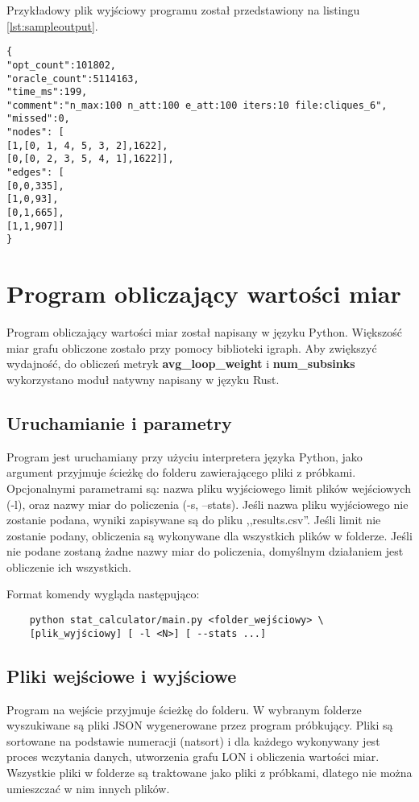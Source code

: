 Przykładowy plik wyjściowy programu został przedstawiony na listingu \ref{lst:sampleoutput}.

\begin{lstlisting}[caption={Przykład pliku wyjściowego po krótkim próbkowaniu małej instancji}, label=lst:sampleoutput]
{
"opt_count":101802,
"oracle_count":5114163,
"time_ms":199,
"comment":"n_max:100 n_att:100 e_att:100 iters:10 file:cliques_6",
"missed":0,
"nodes": [
[1,[0, 1, 4, 5, 3, 2],1622],
[0,[0, 2, 3, 5, 4, 1],1622]],
"edges": [
[0,0,335],
[1,0,93],
[0,1,665],
[1,1,907]]
}
\end{lstlisting}

\section{Program obliczający wartości miar}

Program obliczający wartości miar został napisany w języku Python.
Większość miar grafu obliczone zostało przy pomocy biblioteki igraph.
Aby zwiększyć wydajność, do obliczeń metryk \textbf{avg\_loop\_weight} i \textbf{num\_subsinks}
wykorzystano moduł natywny napisany w języku Rust.

\subsection{Uruchamianie i parametry}

Program jest uruchamiany przy użyciu interpretera języka Python, jako argument przyjmuje
ścieżkę do folderu zawierającego pliki z próbkami. Opcjonalnymi parametrami są: nazwa pliku wyjściowego
limit plików wejściowych (-l), oraz nazwy miar do policzenia (-s, --stats). Jeśli nazwa pliku wyjściowego nie zostanie podana, wyniki zapisywane
są do pliku ,,results.csv''. Jeśli limit nie zostanie podany, obliczenia są wykonywane dla wszystkich plików w folderze.
Jeśli nie podane zostaną żadne nazwy miar do policzenia, domyślnym działaniem jest obliczenie ich wszystkich.

Format komendy wygląda następująco:
\begin{lstlisting}
    python stat_calculator/main.py <folder_wejściowy> \
    [plik_wyjściowy] [ -l <N>] [ --stats ...]
\end{lstlisting}

\subsection{Pliki wejściowe i wyjściowe}
Program na wejście przyjmuje ścieżkę do folderu. W wybranym folderze wyszukiwane są pliki JSON wygenerowane przez program próbkujący.
Pliki są sortowane na podstawie numeracji (natsort) i dla każdego wykonywany jest proces wczytania danych, utworzenia grafu LON i obliczenia
wartości miar. Wszystkie pliki w folderze są traktowane jako pliki z próbkami, dlatego nie można umieszczać w nim innych plików.

